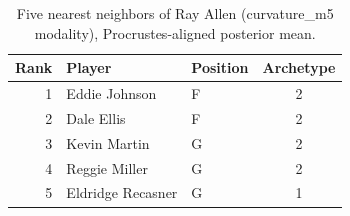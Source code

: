 \begin{table}[htbp]
  \centering\small
  \begin{tabular}{rllc}
    \toprule
    Rank & Player & Position & Archetype \\
    \midrule
    1 & Eddie Johnson & F & 2 \\
    2 & Dale Ellis & F & 2 \\
    3 & Kevin Martin & G & 2 \\
    4 & Reggie Miller & G & 2 \\
    5 & Eldridge Recasner & G & 1 \\
    \bottomrule
  \end{tabular}
  \caption{Five nearest neighbors of Ray Allen (curvature_m5 modality), Procrustes-aligned posterior mean.}
  \label{tab:Ray_Allen_neighbors_curvature_m5}
\end{table}

